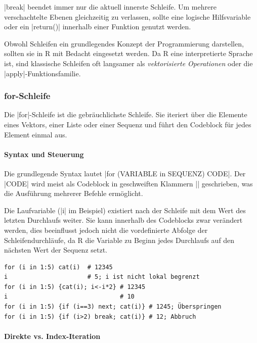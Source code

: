\documentclass[10pt,twocolumn]{scrartcl}
\renewcommand{\lstinline}{\mycoloredinline}
\begin{document}
\lstinline|break| beendet immer nur die aktuell innerste Schleife. Um mehrere verschachtelte Ebenen gleichzeitig zu verlassen, sollte eine logische Hilfsvariable oder ein \lstinline|return()| innerhalb einer Funktion genutzt werden.

Obwohl Schleifen ein grundlegendes Konzept der Programmierung darstellen, sollten sie in R mit Bedacht eingesetzt werden. Da R eine interpretierte Sprache ist, sind klassische Schleifen oft langsamer als \emph{vektorisierte Operationen} oder die \lstinline|apply|-Funktionsfamilie.


\subsubsection{for-Schleife}

Die \lstinline|for|-Schleife ist die gebräuchlichste Schleife. Sie iteriert über die Elemente eines Vektors, einer Liste oder einer Sequenz und führt den Codeblock für jedes Element einmal aus.

\paragraph{Syntax und Steuerung}

Die grundlegende Syntax lautet \lstinline|for (VARIABLE in SEQUENZ) CODE|. Der \lstinline|CODE| wird meist als Codeblock in geschweiften Klammern \lstinline|{}| geschrieben, was die Ausführung mehrerer Befehle ermöglicht.

Die Laufvariable (\lstinline|i| im Beispiel) existiert nach der Schleife mit dem Wert des letzten Durchlaufs weiter. Sie kann innerhalb des Codeblocks zwar verändert werden, dies beeinflusst jedoch nicht die vordefinierte Abfolge der Schleifendurchläufe, da R die Variable zu Beginn jedes Durchlaufs auf den nächsten Wert der Sequenz setzt.

\begin{lstlisting}
for (i in 1:5) cat(i)  # 12345
i                      # 5; i ist nicht lokal begrenzt
for (i in 1:5) {cat(i); i<-i*2} # 12345
i                               # 10
for (i in 1:5) {if (i==3) next; cat(i)} # 1245; Überspringen
for (i in 1:5) {if (i>2) break; cat(i)} # 12; Abbruch
\end{lstlisting}


\paragraph{Direkte vs. Index-Iteration}
\end{document}
